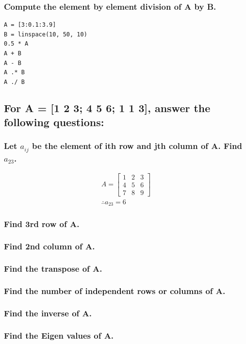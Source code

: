 \documentclass[12pt,a4paper]{article}
\begin{document}
\subsubsection{Compute the element by element division of A by B.} 
\begin{lstlisting}
A = [3:0.1:3.9]
B = linspace(10, 50, 10)
0.5 * A
A + B
A - B
A .* B
A ./ B
\end{lstlisting}

\subsection{For A = [1 2 3; 4 5 6; 1 1 3], answer the following questions:} 

\subsubsection{Let $a_{ij}$ be the element of ith row and jth column of A. Find $a_{23}$.} 
\begin{gather*}
A = 
\begin{bmatrix}
1&2&3\\4&5&6\\7&8&9
\end{bmatrix}\\
\therefore a_{23}=6
\end{gather*}
\subsubsection{Find 3rd row of A.} 

\subsubsection{Find 2nd column of A.} 

\subsubsection{Find the transpose of A.} 
\subsubsection{Find the number of independent rows or columns of A.} 
\subsubsection{Find the inverse of A.} 

\subsubsection{Find the Eigen values of A.} 
\end{document}
